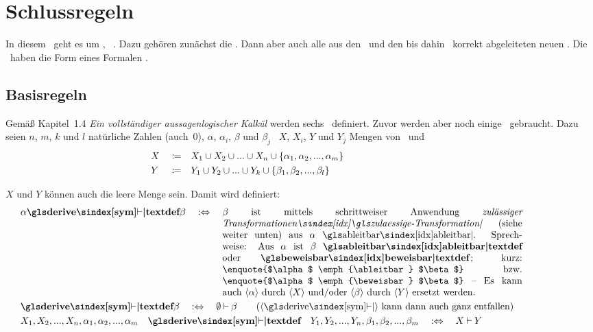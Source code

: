\section{Schlussregeln}%
\label{sec:Schlussregeln}

In diesem \sectionname\ geht es um \zulaessigeTransformationen, \textdh\ \allgemeingueltigeSchlussregel.
Dazu gehören zunächst die \Basisregeln.
Dann aber auch alle aus den \Basisregeln\ und den bis dahin \allgemeingueltigenSchlussregeln\ korrekt abgeleiteten neuen \Schlussregeln.
Die \Schlussregeln\ haben die Form eines Formalen \Satzes.

\subsection{Basisregeln}%
\label{sub:Basisregeln}

Gemäß \cite{bib:Rautenberg} Kapitel~1.4 \emph{Ein vollständiger aussagenlogischer Kalkül} werden sechs \Basisregeln\ definiert. Zuvor werden aber noch einige \Definitionen\ gebraucht. Dazu seien $n$, $m$, $k$ und $l$ natürliche Zahlen (auch~0), $\alpha$, $\alpha_i$, $\beta$ und $\beta_j$ \Formeln\, $X$, $X_i$, $Y$ und $Y_j$ Mengen von \Formeln\ und
\begin{align}
	&X&&\coloneqq&&X_1\cup X_2\cup...\cup X_n\cup\{\alpha_1,\alpha_2,...,\alpha_m\}
	\\
	&Y&&\coloneqq&&Y_1\cup Y_2\cup...\cup Y_k\cup\{\beta_1, \beta_2, ...,\beta_l \}
	&&&&&&&&&&&&&&&&&&&&
\end{align}

$X$ und $Y$ können auch die leere Menge sein. Damit wird definiert:
\begin{align}
	& \alpha \definition{\symderive} \beta \quad \metadefeq \quad
	\parbox[t]{11cm}{%
	$\beta$ ist mittels schrittweiser Anwendung \emph{\zulaessigerTransformationen} (siehe weiter unten) aus $\alpha$ \ableitbar.
	Sprechweise: Aus $\alpha$ ist $\beta$ \definition{\ableitbar} oder \definition{\beweisbar};
	kurz: \enquote{$\alpha$ \emph{\ableitbar} $\beta$} \textbzw\ \enquote{$\alpha$ \emph{\beweisbar} $\beta$}
	-- Es kann auch \chrqt{$\alpha$} durch \chrqt{$X$} und/oder \chrqt{$\beta$} durch \chrqt{$Y$} ersetzt werden.
	}
	\label{def:ableitbar}
	\\
	& \definition{\symderive} \beta \quad \metadefeq \quad \emptyset \derive \beta \qquad \text{(\chrqt{\symderive} kann dann auch ganz entfallen)}
	\\
	& X_1,X_2,...,X_n,\alpha_1,\alpha_2,...,\alpha_m\quad
	\definition{\symderive}\quad Y_1,Y_2,...,Y_n, \beta_1, \beta_2,..., \beta_m\quad
	\metadefeq \quad X \derive Y
	\label{def:ableitbarKurz}
	\formulatoleft
\end{align}

